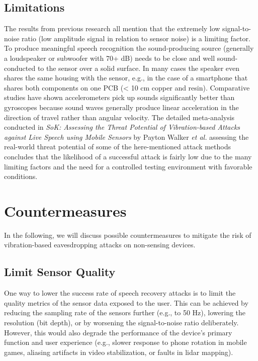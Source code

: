 \documentclass[sigconf, nonacm]{acmart}
\begin{document}
\subsection{Limitations}
The results from previous research all mention that the extremely low signal-to-noise ratio (low amplitude signal in relation to sensor noise) is a limiting factor.
To produce meaningful speech recognition the sound-producing source (generally a loudspeaker or subwoofer with 70+ dB) needs to be close and well sound-conducted to the sensor over a solid surface.
In many cases the speaker even shares the same housing with the sensor, e.g., in the case of a smartphone that shares both components on one PCB (< 10 cm copper and resin).
Comparative studies have shown accelerometers pick up sounds significantly better than gyroscopes \cite{AccelEve2020} because sound waves generally produce linear acceleration in the direction of travel rather than angular velocity.
The detailed meta-analysis conducted in \textit{SoK: Assessing the Threat Potential of Vibration-based Attacks against Live Speech using Mobile Sensors} \cite{SokVibration2021} by Payton Walker \textit{et al.} assessing the real-world threat potential of some of the here-mentioned attack methods concludes that the likelihood of a successful attack is fairly low due to the many limiting factors and the need for a controlled testing environment with favorable conditions.

\section{Countermeasures}
In the following, we will discuss possible countermeasures to mitigate the risk of vibration-based eavesdropping attacks on non-sensing devices.

\subsection{Limit Sensor Quality}
One way to lower the success rate of speech recovery attacks is to limit the quality metrics of the sensor data exposed to the user.
This can be achieved by reducing the sampling rate of the sensors further (e.g., to 50 Hz), lowering the resolution (bit depth), or by worsening the signal-to-noise ratio deliberately.
However, this would also degrade the performance of the device's primary function and user experience (e.g., slower response to phone rotation in mobile games, aliasing artifacts in video stabilization, or faults in lidar mapping).
\end{document}
